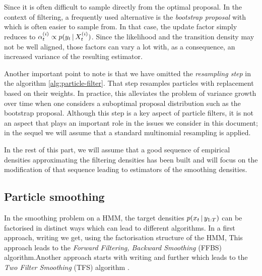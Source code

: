 Since it is often difficult to sample directly from the optimal proposal. In the context of filtering, a frequently used alternative is the \emph{bootstrap proposal} \citep{doucet11} with 
which is often easier to sample from. In that case, the update factor simply reduces to $\alpha^{(i)}_t \propto p(y_t\,|\, X^{(i)}_t)$. Since the likelihood and the transition density may not be well aligned, those factors can vary a lot with, as a consequence, an increased variance of the resulting estimator.

Another important point to note is that we have omitted the \emph{resampling step} in the algorithm \ref{alg:particle-filter}. That step resamples particles with replacement based on their weights. In practice, this alleviates the problem of variance growth over time when one considers a suboptimal proposal distribution such as the bootstrap proposal. Although this step is a key aspect of particle filters, it is not an aspect that plays an important role in the issues we consider in this document; in the sequel we will assume that a standard multinomial resampling is applied.\addref

 In the rest of this part, we will assume that a good sequence of empirical densities approximating the filtering densities has been built and will focus on the modification of that sequence leading to estimators of the smoothing densities.
\subsection{Particle smoothing}
In the smoothing problem on a HMM, the target densities $p(x_t\,|\, y_{1:T})$ can be factorised in distinct ways which can lead to different algorithms. In a first approach, writing 
 we get, using the factorisation structure of the HMM,
This approach leads to the \emph{Forward Filtering, Backward Smoothing} (FFBS) algorithm.\addref Another approach starts with writing 
and further
which leads to the \emph{Two Filter Smoothing} (TFS) algorithm \citep{kitagawa96}.

